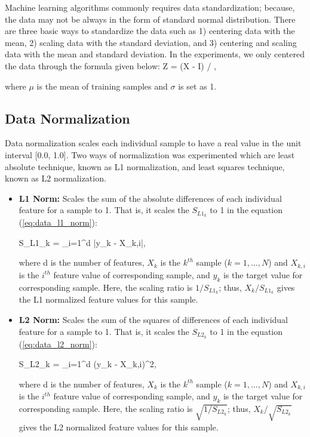 Machine learning algorithms commonly requires data standardization; because, the data may not be always in the form of standard normal distribution. There are three basic ways to standardize the data such as 1) centering data with the mean, 2) scaling data with the standard deviation, and 3) centering and scaling data with the mean and standard deviation. In the experiments, we only centered the data through the formula given below:
\be
\label{eq:data_standardization}
Z = (X - \mu * I) / \sigma\:,
\ee

where $\mu$ is the mean of training samples and $\sigma$ is set as 1. 


\subsection{Data Normalization}

Data normalization scales each individual sample to have a real value in the unit interval [0.0, 1.0]. Two ways of normalization was experimented which are least absolute technique, known as L1 normalization, and least squares technique, known as L2 normalization.

\begin{itemize}
	\item \textbf{L1 Norm:} Scales the sum of the absolute differences of each individual feature for a sample to 1. That is, it scales the $S_{{L1}_{k}}$ to 1 in the equation (\ref{eq:data_l1_norm}):
	
	\be
	\label{eq:data_l1_norm}
	S_{{L1}_{k}} = \sum_{i=1}^{d} \big|y_{k} - X_{k,i}\big|\:,
	\ee
	
	where d is the number of features, $X_{k}$ is the $k^{th}$ sample ($k=1,\ldots,N$) and $X_{k,i}$ is the $i^{th}$ feature value of corresponding sample, and $y_{k}$ is the target value for corresponding sample. Here, the scaling ratio is $1 / S_{{L1}_{k}}$; thus, $X_{k} / S_{{L1}_{k}}$ gives the L1 normalized feature values for this sample.
	
	\item \textbf{L2 Norm:} Scales the sum of the squares of differences of each individual feature for a sample to 1. That is, it scales the $S_{{L2}_{k}}$ to 1 in the equation (\ref{eq:data_l2_norm}):
	
	\be
	\label{eq:data_l2_norm}
	S_{{L2}_{k}} = \sum_{i=1}^{d} \big(y_{k} - X_{k,i}\big)^{2}\:,
	\ee
	
	where d is the number of features, $X_{k}$ is the $k^{th}$ sample ($k=1,\ldots,N$) and $X_{k,i}$ is the $i^{th}$ feature value of corresponding sample, and $y_{k}$ is the target value for corresponding sample. Here, the scaling ratio is $\sqrt{1 / S_{{L2}_{k}}}$; thus, $X_{k} / \sqrt{S_{{L2}_{k}}}$ gives the L2 normalized feature values for this sample.
\end{itemize}

